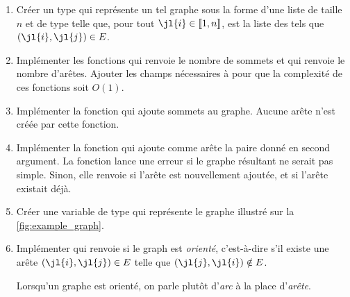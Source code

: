\documentclass{article}
\newcommand{\llbra}{\left\llbracket}
\newcommand{\rrbra}{\right\rrbracket}
\renewcommand{\brack}[1]{\ensuremath{\llbra#1\rrbra}}
\begin{document}
\begin{enumerate}
	\item Créer un type  qui représente un tel graphe sous la forme d'une liste  de taille $n$ et de type  telle que, pour tout $\jl{i}\in\brack{1,n}$,  est la liste des  tels que $(\jl{i},\jl{j})\in E$.
	
	\item Implémenter les fonctions  qui renvoie le nombre de sommets et  qui renvoie le nombre d'arêtes. Ajouter les champs nécessaires à  pour que la complexité de ces fonctions soit $O(1)$.
	
	\item Implémenter la fonction  qui ajoute  sommets au graphe. Aucune arête n'est créée par cette fonction.

	\item Implémenter la fonction  qui ajoute comme arête la paire  donné en second argument. La fonction lance une erreur si le graphe résultant ne serait pas simple. Sinon, elle renvoie  si l'arête est nouvellement ajoutée, et  si l'arête existait déjà.



	\item Créer une variable  de type  qui représente le graphe illustré sur la \autoref{fig:example_graph}.

	\item Implémenter  qui renvoie  si le graph est \emph{orienté}, c'est-à-dire s'il existe une arête $(\jl{i},\jl{j})\in E$ telle que $(\jl{j},\jl{i})\notin E$.

	Lorsqu'un graphe est orienté, on parle plutôt d'\emph{arc} à la place d'\emph{arête}.
\end{enumerate}
\end{document}
